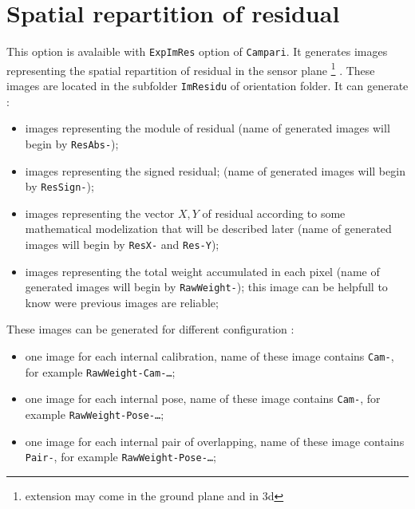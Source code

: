 \section{Spatial repartition of residual}

This option is avalaible with {\tt ExpImRes} option of {\tt Campari}.
It generates images representing the spatial repartition of residual
in the sensor plane \footnote{extension may come in the ground plane and in $3$d} . 
These images are located in the subfolder
{\tt ImResidu} of orientation folder. It can generate :

\begin{itemize}
   \item images  representing the module of residual 
          (name of generated images will begin by {\tt ResAbs-});

   \item images  representing the signed residual;
          (name of generated images will begin by {\tt ResSign-});

   \item images  representing the vector $X,Y$ of residual according to some
         mathematical modelization that will be described later 
         (name of generated images will begin by {\tt ResX-} and {\tt Res-Y});

   \item images  representing the total weight accumulated in each pixel
          (name of generated images will begin by {\tt RawWeight-});
          this image can be helpfull to know were previous images are reliable;
   

\end{itemize}

These images can be generated for  different configuration :

\begin{itemize}
   \item one image for each internal calibration, name of these image contains {\tt Cam-},
         for example {\tt  RawWeight-Cam-\dots};

   \item one image for each internal pose, name of these image contains {\tt Cam-},
         for example {\tt  RawWeight-Pose-\dots};

   \item one image for each internal pair of overlapping, name of these image contains {\tt Pair-},
         for example {\tt  RawWeight-Pose-\dots};
\end{itemize}

